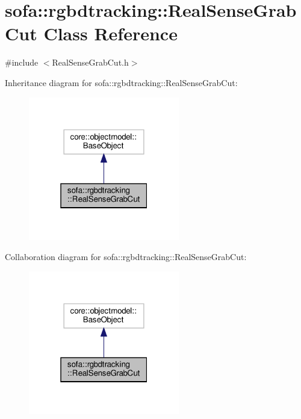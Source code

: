 \hypertarget{classsofa_1_1rgbdtracking_1_1_real_sense_grab_cut}{}\section{sofa\+:\+:rgbdtracking\+:\+:Real\+Sense\+Grab\+Cut Class Reference}
\label{classsofa_1_1rgbdtracking_1_1_real_sense_grab_cut}


{\ttfamily \#include $<$Real\+Sense\+Grab\+Cut.\+h$>$}



Inheritance diagram for sofa\+:\+:rgbdtracking\+:\+:Real\+Sense\+Grab\+Cut\+:\nopagebreak
\begin{figure}[H]
\begin{center}
\leavevmode
\includegraphics[width=187pt]{classsofa_1_1rgbdtracking_1_1_real_sense_grab_cut__inherit__graph}
\end{center}
\end{figure}


Collaboration diagram for sofa\+:\+:rgbdtracking\+:\+:Real\+Sense\+Grab\+Cut\+:\nopagebreak
\begin{figure}[H]
\begin{center}
\leavevmode
\includegraphics[width=187pt]{classsofa_1_1rgbdtracking_1_1_real_sense_grab_cut__coll__graph}
\end{center}
\end{figure}
